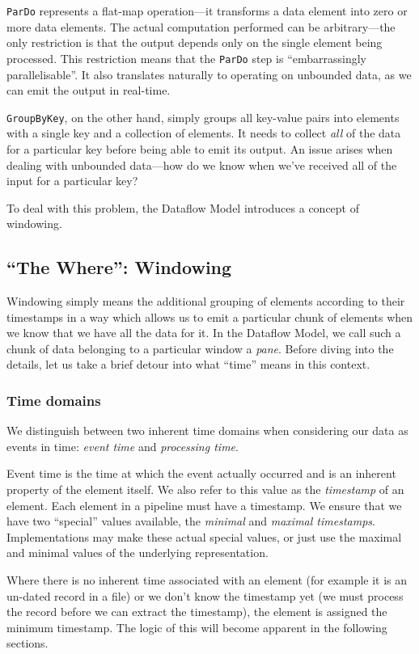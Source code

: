 \verb|ParDo| represents a flat-map operation---it transforms a data element into zero or more data elements.
The actual computation performed can be arbitrary---the only restriction is that the output depends only on the single element being processed.
This restriction means that the \verb|ParDo| step is ``embarrassingly parallelisable''.
It also translates naturally to operating on unbounded data, as we can emit the output in real-time.

\verb|GroupByKey|, on the other hand, simply groups all key-value pairs into elements with a single key and a collection of elements.
It needs to collect \emph{all} of the data for a particular key before being able to emit its output.
An issue arises when dealing with unbounded data---how do we know when we've received all of the input for a particular key?

To deal with this problem, the Dataflow Model introduces a concept of windowing.

\subsection{``The Where'': Windowing}\label{sec:prep:dataflow:where}

Windowing simply means the additional grouping of elements according to their timestamps in a way which allows us to emit a particular chunk of elements when we know that we have all the data for it.
In the Dataflow Model, we call such a chunk of data belonging to a particular window a \emph{pane}.
Before diving into the details, let us take a brief detour into what ``time'' means in this context.

\subsubsection{Time domains}
We distinguish between two inherent time domains when considering our data as events in time: \emph{event time} and \emph{processing time}.

Event time is the time at which the event actually occurred and is an inherent property of the element itself.
We also refer to this value as the \emph{timestamp} of an element.
Each element in a pipeline must have a timestamp.
We ensure that we have two ``special'' values available, the \emph{minimal} and \emph{maximal timestamps}.
Implementations may make these actual special values, or just use the maximal and minimal values of the underlying representation.

Where there is no inherent time associated with an element (for example it is an un-dated record in a file) or we don't know the timestamp yet (we must process the record before we can extract the timestamp), the element is assigned the minimum timestamp.
The logic of this will become apparent in the following sections.

